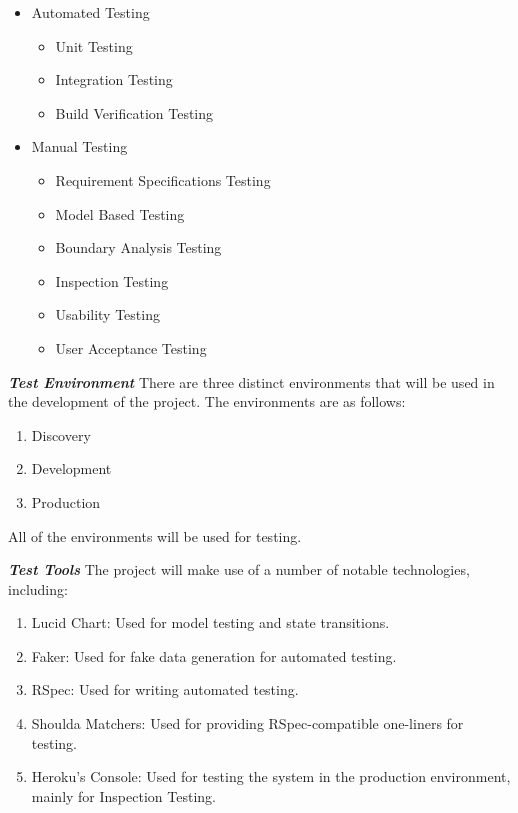 \begin{justify}
    \begin{itemize}
        \item Automated Testing
            \begin{itemize}
              \item Unit Testing
              \item Integration Testing
              \item Build Verification Testing
            \end{itemize}
        \item Manual Testing
            \begin{itemize}
                \item Requirement Specifications Testing
                \item Model Based Testing
                \item Boundary Analysis Testing
                \item Inspection Testing
                \item Usability Testing
                \item User Acceptance Testing
            \end{itemize}
    \end{itemize}


    \vspace{0.25cm}
    \newendline \textbf{\textit{Test Environment}}\newendline
    There are three distinct environments that will be used in the development of the project. The environments are as follows:

    \begin{enumerate}
        \item Discovery
        \item Development
        \item Production
    \end{enumerate}

    \newendline All of the environments will be used for testing.

    \vspace{0.25cm}
    \newendline \textbf{\textit{Test Tools}}\newendline
    The project will make use of a number of notable technologies, including:

    \begin{enumerate}
        \item Lucid Chart: Used for model testing and state transitions.
        \item Faker: Used for fake data generation for automated testing.
        \item RSpec: Used for writing automated testing.
        \item Shoulda Matchers: Used for providing RSpec-compatible one-liners for testing.
        \item Heroku's Console: Used for testing the system in the production environment, mainly for Inspection Testing.
    \end{enumerate}


\end{justify}
